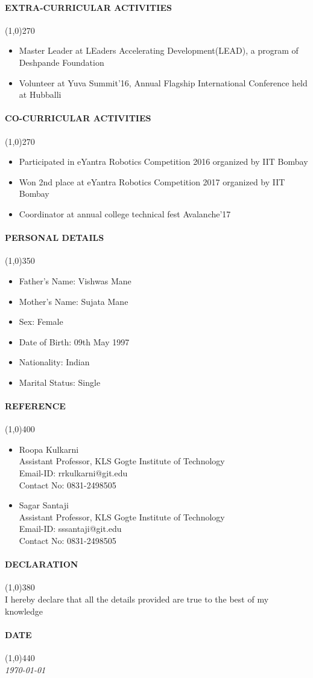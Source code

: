 \documentclass[12pt,a4paper]{article}
\begin{document}
\paragraph{EXTRA-CURRICULAR ACTIVITIES}
	\line(1,0){270}
	\begin{itemize}
		\item Master Leader at LEaders Accelerating Development(LEAD), a program of Deshpande Foundation
		\item Volunteer at Yuva Summit'16, Annual Flagship International Conference held at Hubballi
	\end{itemize}
\paragraph{CO-CURRICULAR ACTIVITIES}
	\line(1,0){270}
	\begin{itemize}
		\item Participated in eYantra Robotics Competition 2016 organized by IIT Bombay
		\item Won 2nd place at eYantra Robotics Competition 2017 organized by IIT Bombay
		\item Coordinator at annual college technical fest Avalanche'17
	\end{itemize}
\paragraph{PERSONAL DETAILS}
	\line(1,0){350}
	\begin{itemize}
		\item Father's Name: Vishwas Mane
		\item Mother's Name: Sujata Mane
		\item Sex: Female
		\item Date of Birth: 09th May 1997
		\item Nationality: Indian
		\item Marital Status: Single
	\end{itemize}
\paragraph{REFERENCE}
	\line(1,0){400}
	\begin{itemize}
		\item Roopa Kulkarni\\
		Assistant Professor, KLS Gogte Institute of Technology\\
		Email-ID: rrkulkarni@git.edu\\
		Contact No: 0831-2498505
		\item Sagar Santaji\\
		Assistant Professor, KLS Gogte Institute of Technology\\
		Email-ID: sssantaji@git.edu\\
		Contact No: 0831-2498505
		
	\end{itemize}
\paragraph{DECLARATION}
	\line(1,0){380}\\
	I hereby declare that all the details provided are true to the best of my knowledge
\paragraph{DATE}
	\line(1,0){440}\\
	\em\today
\end{document}
